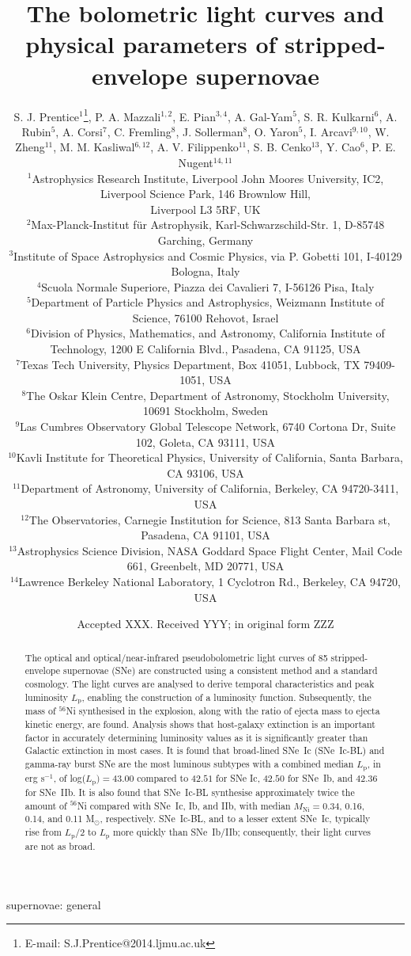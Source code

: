 \documentclass[a4paper,fleqn,usenatbib]{mnras}
\title[Bolometric light curves of SE-SNe]{The bolometric light curves and physical parameters of stripped-envelope supernovae}
\author[S. J. Prentice]{S. J. Prentice$^{1}$\thanks{E-mail: S.J.Prentice@2014.ljmu.ac.uk}, P. A. Mazzali$^{1,2}$, E. Pian$^{3,4}$,  A. Gal-Yam$^{5}$, S. R. Kulkarni$^{6}$, \newauthor A. Rubin$^{5}$, A. Corsi$^{7}$, C. Fremling$^{8}$, J. Sollerman$^{8}$, O. Yaron$^{5}$, I. Arcavi$^{9,10}$, \newauthor  W. Zheng$^{11}$, M. M. Kasliwal$^{6,12}$, A. V. Filippenko$^{11}$, S. B. Cenko$^{13}$, Y. Cao$^{6}$, \newauthor P. E. Nugent$^{14,11}$\\
$^{1}$Astrophysics Research Institute, Liverpool John Moores University, IC2, Liverpool Science Park, 146 Brownlow Hill, \\  Liverpool L3 5RF, UK\\
$^{2}$Max-Planck-Institut f{\"u}r Astrophysik, Karl-Schwarzschild-Str. 1, D-85748 Garching, Germany\\
$^{3}$Institute of Space Astrophysics and Cosmic Physics, via P. Gobetti 101, I-40129 Bologna, Italy\\
$^{4}$Scuola Normale Superiore, Piazza dei Cavalieri 7, I-56126 Pisa, Italy\\
$^{5}$Department of Particle Physics and Astrophysics, Weizmann Institute of Science, 76100 Rehovot, Israel\\
$^{6}$Division of Physics, Mathematics, and Astronomy, California Institute of Technology, 1200 E California Blvd., Pasadena, CA 91125, USA \\
$^{7}$Texas Tech University, Physics Department, Box 41051, Lubbock, TX 79409-1051, USA\\
$^{8}$The Oskar Klein Centre, Department of Astronomy, Stockholm University, 10691 Stockholm, Sweden\\
$^{9}$Las Cumbres Observatory Global Telescope Network, 6740 Cortona Dr, Suite 102, Goleta, CA 93111, USA\\
$^{10}$Kavli Institute for Theoretical Physics, University of California, Santa Barbara, CA 93106, USA\\
$^{11}$Department of Astronomy, University of California, Berkeley, CA 94720-3411, USA\\
$^{12}$The Observatories, Carnegie Institution for Science, 813 Santa Barbara st, Pasadena, CA 91101, USA\\
$^{13}$Astrophysics Science Division, NASA Goddard Space Flight Center, Mail Code 661, Greenbelt, MD 20771, USA\\
$^{14}$Lawrence Berkeley National Laboratory, 1 Cyclotron Rd., Berkeley, CA 94720, USA\\
}
\date{Accepted XXX. Received YYY; in original form ZZZ}
\begin{document}
\label{firstpage}
\pagerange{\pageref{firstpage}--\pageref{lastpage}}
\maketitle

\begin{abstract}
The optical and optical/near-infrared pseudobolometric light curves of 85 stripped-envelope supernovae (SNe) are constructed using a consistent method and a standard cosmology. The light curves are analysed to derive temporal characteristics and peak luminosity $L_{\mathrm{p}}$, enabling the construction of a luminosity function. Subsequently, the mass of $^{56}$Ni synthesised in the explosion, along with the ratio of ejecta mass to ejecta kinetic energy, are found. Analysis shows that host-galaxy extinction is an important factor in accurately determining luminosity values as it is significantly greater than Galactic extinction in most cases. It is found that broad-lined SNe~Ic (SNe~Ic-BL) and gamma-ray burst SNe are the most luminous subtypes with a combined median $L_{\mathrm{p}}$, in erg s$^{-1}$, of log($L_{\mathrm{p}})=43.00$ compared to $42.51$ for SNe Ic, $42.50$ for SNe~Ib, and $42.36$ for SNe~IIb. It is also found that SNe~Ic-BL synthesise approximately twice the amount of $^{56}$Ni compared with SNe~Ic, Ib, and IIb, with median $M_{\mathrm{Ni}} = 0.34$, 0.16, 0.14, and 0.11 M$_{\odot}$, respectively. SNe~Ic-BL, and to a lesser extent SNe~Ic, typically rise from $L_{\mathrm{p}}/2$ to $L_{\mathrm{p}}$ more quickly than SNe~Ib/IIb; consequently, their light curves are not as broad.
\end{abstract}

\begin{keywords}
supernovae: general
\end{keywords}


\end{document}
